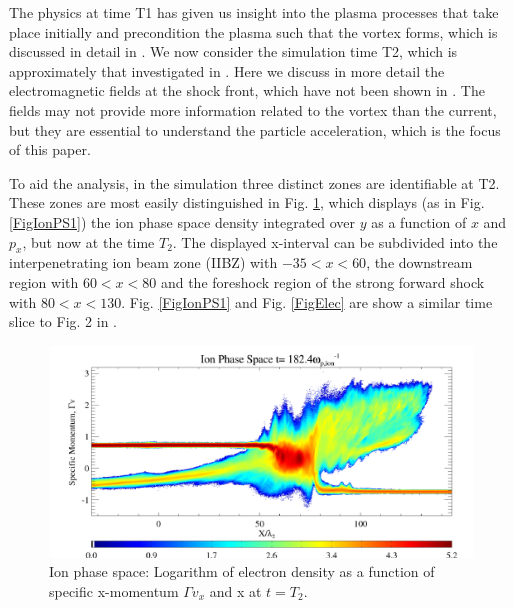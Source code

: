 \documentclass[structabstract]{aa}
\begin{document}
The physics at time
T1 has given us insight into the plasma processes that take place initially
and precondition the plasma such that the vortex forms, which is discussed 
in detail in . We now consider the simulation time T2, 
which is approximately that investigated in . Here we 
discuss in more detail the electromagnetic fields at the shock front, which 
have not been shown in . The fields may not provide more
information related to the vortex than the current, but they are essential
to understand the particle acceleration, which is the focus of this paper.

 To aid the analysis, in the simulation three distinct 
zones are identifiable at T2. These zones are most easily distinguished in Fig. \ref{FigIonPST2}, which 
displays (as in Fig. \ref{FigIonPS1}) the ion phase space density integrated over $y$ as a function 
of $x$ and $p_x$, but now at the time $T_2$. The displayed x-interval can be subdivided into the interpenetrating
ion beam zone (IIBZ) with $-35 < x < 60$, the downstream region with $60 < x < 80$ and the foreshock region of
the strong forward shock with $80 < x < 130$.  
Fig.  \ref{FigIonPS1} and Fig.  \ref{FigElec} are show a similar time slice to Fig. 2 in .

      \begin{figure}
   \centering
   \includegraphics[width=\columnwidth]{15294f9.png}
      \caption{Ion phase space: Logarithm of electron density as a function of specific x-momentum $\Gamma v_x$ 
and x at $t=T_2$. 
                    }
         \label{FigIonPST2}
   \end{figure}
\end{document}
